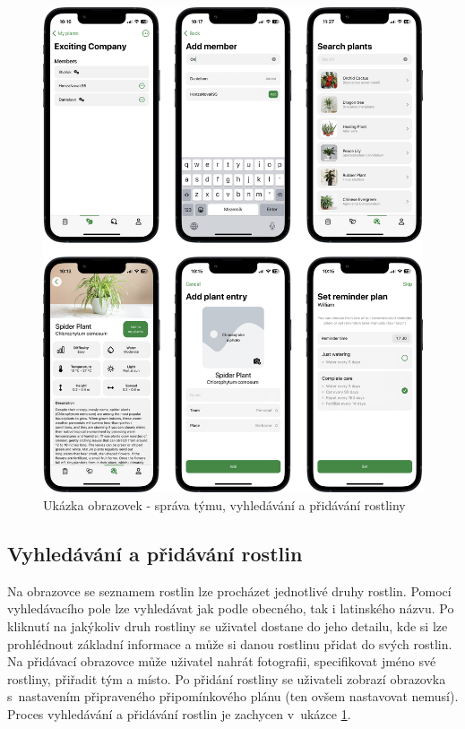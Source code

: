 \documentclass[thesis=M,czech]{FITthesis}[2019/12/23]
\begin{document}
\begin{figure}
	\centering
	\includegraphics[width=1\linewidth]{images/screenshots-3.png}
  	\caption{Ukázka obrazovek - správa týmu, vyhledávání a přidávání rostliny}
  	\label{img:screenshots-3}
\end{figure}

\subsection{Vyhledávání a přidávání rostlin}
Na obrazovce se seznamem rostlin lze procházet jednotlivé druhy rostlin. Pomocí vyhledávacího pole lze vyhledávat jak podle obecného, tak i latinského názvu. Po kliknutí na jakýkoliv druh rostliny se uživatel dostane do jeho detailu, kde si lze prohlédnout základní informace a může si danou rostlinu přidat do svých rostlin. Na přidávací obrazovce může uživatel nahrát fotografii, specifikovat jméno své rostliny, přiřadit tým a místo. Po přidání rostliny se uživateli zobrazí obrazovka s~nastavením připraveného připomínkového plánu (ten ovšem nastavovat nemusí). Proces vyhledávání a přidávání rostlin je zachycen v~ukázce \ref{img:screenshots-3}.
\end{document}
